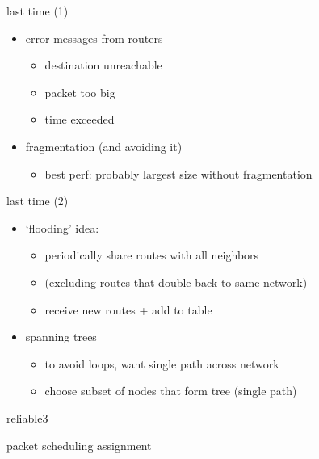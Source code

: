 \date{}
\title{}
\date{}

\begin{frame}
    \titlepage
\end{frame}

\begin{frame}{last time (1)}
    \begin{itemize}
    \item error messages from routers
        \begin{itemize}
        \item destination unreachable
        \item packet too big
        \item time exceeded
        \end{itemize}
    \item fragmentation (and avoiding it)
        \begin{itemize}
        \item best perf: probably largest size without fragmentation
        \end{itemize}
    \end{itemize}
\end{frame}

\begin{frame}{last time (2)}
    \begin{itemize}
    \item `flooding' idea:
        \begin{itemize}
        \item periodically share routes with all neighbors
        \item (excluding routes that double-back to same network)
        \item receive new routes + add to table
        \end{itemize}
    \item spanning trees
        \begin{itemize}
        \item to avoid loops, want single path across network
        \item choose subset of nodes that form tree (single path)
        \end{itemize}
    \end{itemize}
\end{frame}

\begin{frame}{reliable3}
\end{frame}

\begin{frame}{packet scheduling assignment}
\end{frame}

